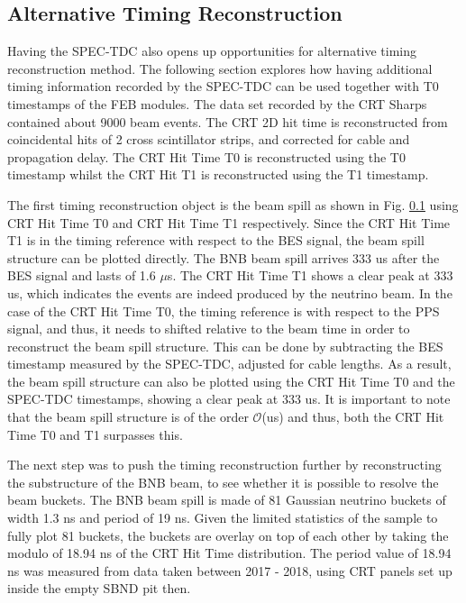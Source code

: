 \subsection{Alternative Timing Reconstruction}

Having the SPEC-TDC also opens up opportunities for alternative timing reconstruction method. 
The following section explores how having additional timing information recorded by the SPEC-TDC can be used together with T0 timestamps of the FEB modules.
The data set recorded by the CRT Sharps contained about 9000 beam events. 
The CRT 2D hit time is reconstructed from coincidental hits of 2 cross scintillator strips, and corrected for cable and propagation delay.
The CRT Hit Time T0 is reconstructed using the T0 timestamp whilst the CRT Hit T1 is reconstructed using the T1 timestamp. 

The first timing reconstruction object is the beam spill as shown in Fig. \ref{} using CRT Hit Time T0 and CRT Hit Time T1 respectively.
Since the CRT Hit Time T1 is in the timing reference with respect to the BES signal, the beam spill structure can be plotted directly.
The BNB beam spill arrives 333 us after the BES signal and lasts of 1.6 $\mu$s.
The CRT Hit Time T1 shows a clear peak at 333 us, which indicates the events are indeed produced by the neutrino beam.
In the case of the CRT Hit Time T0, the timing reference is with respect to the PPS signal, and thus, it needs to shifted relative to the beam time in order to reconstruct the beam spill structure.
This can be done by subtracting the BES timestamp measured by the SPEC-TDC, adjusted for cable lengths.
As a result, the beam spill structure can also be plotted using the CRT Hit Time T0 and the SPEC-TDC timestamps, showing a clear peak at 333 us.
It is important to note that the beam spill structure is of the order $\mathcal{O}$(us) and thus, both the CRT Hit Time T0 and T1 surpasses this.

The next step was to push the timing reconstruction further by reconstructing the substructure of the BNB beam, to see whether it is possible to resolve the beam buckets.
The BNB beam spill is made of 81 Gaussian neutrino buckets of width 1.3 ns and period of 19 ns.
Given the limited statistics of the sample to fully plot 81 buckets, the buckets are overlay on top of each other by taking the modulo of 18.94 ns of the CRT Hit Time distribution.
The period value of 18.94 ns was measured from data taken between 2017 - 2018, using CRT panels set up inside the empty SBND pit then.

